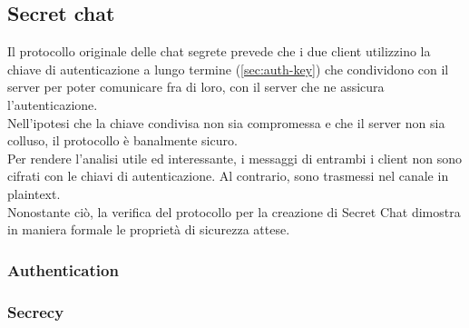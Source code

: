 \subsection{Secret chat}
Il protocollo originale delle chat segrete prevede che i due client utilizzino la chiave di autenticazione a lungo termine (\autoref{sec:auth-key}) che condividono con il server
per poter comunicare fra di loro, con il server che ne assicura l'autenticazione. \\
Nell'ipotesi che la chiave condivisa non sia compromessa e che il server non sia colluso, il protocollo è banalmente sicuro. \\
Per rendere l'analisi utile ed interessante, i messaggi di entrambi i client non sono cifrati con le chiavi di autenticazione.
Al contrario, sono trasmessi nel canale in plaintext. \\
Nonostante ciò, la verifica del protocollo per la creazione di Secret Chat dimostra in maniera formale le proprietà di sicurezza attese. \\

\subsubsection{Authentication}






\subsubsection{Secrecy}







